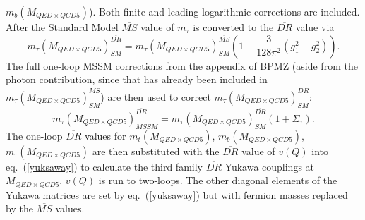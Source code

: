 \documentclass{article}
\begin{document}
$m_b(M_{QED \times QCD5})$).
Both finite and leading logarithmic
corrections are included.
After the Standard Model $\overline{MS}$ value of $m_\tau$ is converted to the
$\overline{DR}$ value via
\begin{equation}
m_\tau(M_{QED \times QCD5})^{\overline{DR}}_{SM} = m_\tau(M_{QED \times QCD5})^{\overline{MS}}_{SM}
\left( 1 - \frac{3}{128 \pi^2} (g_1^2 - g_2^2)\right).
\end{equation}
The full one-loop MSSM corrections from the appendix 
of BPMZ 
(aside from the photon
contribution, since that has already been included in
$m_\tau(M_{QED \times QCD5})^{\overline{MS}}_{SM}$) 
are then used to correct
$m_\tau(M_{QED \times QCD5})^{\overline{DR}}_{SM}$:
\begin{equation}
m_\tau(M_{QED \times QCD5})^{\overline{DR}}_{MSSM} = m_\tau(M_{QED \times QCD5})^{\overline{DR}}_{SM}
 (1 + \Sigma_\tau).
\end{equation}
The one-loop $\overline{DR}$ values for $m_t(M_{QED \times QCD5})$, $m_b(M_{QED \times QCD5})$,
$m_{\tau}(M_{QED \times QCD5})$ are then substituted with the $\overline{DR}$ value
of $v(Q)$ into eq.~(\ref{yuksaway}) to calculate the third family
$\overline{DR}$ Yukawa couplings at $M_{QED \times QCD5}$.
$v(Q)$ is run to two-loops.
The other diagonal elements of the Yukawa matrices are set by
eq.~(\ref{yuksaway}) but with fermion masses replaced by the $\overline{MS}$
values. 
\end{document}
